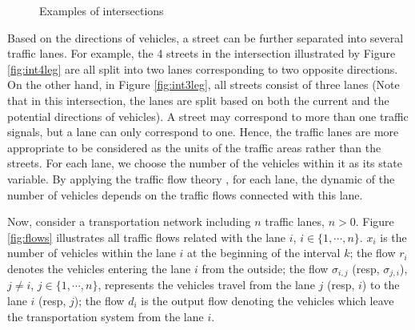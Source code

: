 \documentclass[preprint,authoryear,12pt]{elsarticle}
\begin{document}
\begin{figure}[ht]
  \centering
  \quad
  \caption{Examples of intersections}
\end{figure}

Based on the directions of vehicles, a street can be further
separated into several traffic lanes. For example, the 4 streets in
the intersection illustrated by Figure \ref{fig:int4leg} are all
split into two lanes corresponding to two opposite directions. On the
other hand, in Figure \ref{fig:int3leg}, all streets  consist of
three lanes (Note that in this intersection, the lanes are split
based on both the current and the potential directions of vehicles).
A street may correspond to more than one traffic signals, but a lane
can only correspond to one. Hence, the traffic lanes are more
appropriate to be considered as the units of the traffic areas
rather than  the streets. For each lane, we choose the number of the
vehicles within it as its state variable. By applying the traffic
flow theory \citep{nathan_h_gartner_revised_2005}, for each lane, the
dynamic of the number of vehicles depends on the traffic flows
connected with this lane.

Now, consider a transportation network including $n$ traffic lanes,
$n>0$. Figure \ref{fig:flows} illustrates all traffic flows related
with the lane $i$, $i\in\{1,\cdots,n\}$. $x_i$ is the number of
vehicles within the lane $i$ at the
beginning of the interval $k$; the flow $r_i$ denotes the vehicles
entering the lane $i$ from the outside; the flow $\sigma_{i,j}$
(resp, $\sigma_{j,i}$), $j\neq i$, $j\in\{1,\cdots,n\}$, represents
the vehicles travel from the lane $j$ (resp, $i$) to the lane $i$
(resp, $j$); the flow $d_{i}$ is the output flow denoting the
vehicles which leave the transportation system from the lane $i$.
\end{document}
